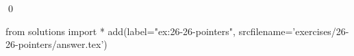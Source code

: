 
\begin{ex}
  \label{ex:26-26-pointers}
  
  \qed
\end{ex}
\begin{python0}
from solutions import *
add(label="ex:26-26-pointers",
    srcfilename='exercises/26-26-pointers/answer.tex')
\end{python0}
